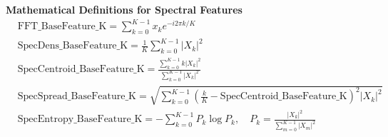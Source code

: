 \documentclass{article}
\begin{document}
\noindent\textbf{Mathematical Definitions for Spectral Features}\vspace{0.3cm}
\begin{align*}
    &\text{FFT\_BaseFeature\_K} = \sum_{k=0}^{K-1} x_k e^{-i 2 \pi k / K} \\
    &\text{SpecDens\_BaseFeature\_K} = \frac{1}{K} \sum_{k=0}^{K-1} |X_k|^2 \\
    &\text{SpecCentroid\_BaseFeature\_K} = \frac{\sum_{k=0}^{K-1} k |X_k|^2}{\sum_{k=0}^{K-1} |X_k|^2} \\
    &\text{SpecSpread\_BaseFeature\_K} = \sqrt{\sum_{k=0}^{K-1} \left( \frac{k}{K} - \text{SpecCentroid\_BaseFeature\_K} \right)^2 |X_k|^2} \\
    &\text{SpecEntropy\_BaseFeature\_K} = -\sum_{k=0}^{K-1} P_k \log P_k, \quad P_k = \frac{|X_k|^2}{\sum_{m=0}^{K-1} |X_m|^2}
\end{align*}
\end{document}

